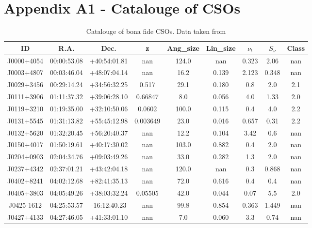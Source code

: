 
\section{Appendix A1 - Catalouge of CSOs}
\begin{table}[H]
    \centering
    \caption{Catalouge of bona fide CSOs. Data taken from \cite{kiehlmann2023compact}}
    \label{tab:CSO_sources}
    \begin{tabular}{@{}ccccccccc@{}}
        \toprule
        ID & R.A. & Dec. & z & Ang\_size & Lin\_size & $\nu_t$ & $S_\nu$ & Class \\ \midrule
        J0000+4054 & 00:00:53.08 & +40:54:01.81 & nan & 124.0 & nan & 0.323 & 2.06 & nan \\
        J0003+4807 & 00:03:46.04 & +48:07:04.14 & nan & 16.2 & 0.139 & 2.123 & 0.348 & nan \\
        J0029+3456 & 00:29:14.24 & +34:56:32.25 & 0.517 & 29.1 & 0.180 & 0.8 & 2.0 & 2.1 \\
        J0111+3906 & 01:11:37.32 & +39:06:28.10 & 0.66847 & 8.0 & 0.056 & 4.0 & 1.33 & 2.0 \\
        J0119+3210 & 01:19:35.00 & +32:10:50.06 & 0.0602 & 100.0 & 0.115 & 0.4 & 4.0 & 2.2 \\
        J0131+5545 & 01:31:13.82 & +55:45:12.98 & 0.003649 & 23.0 & 0.016 & 0.657 & 0.31 & 2.2 \\
        J0132+5620 & 01:32:20.45 & +56:20:40.37 & nan & 12.2 & 0.104 & 3.42 & 0.6 & nan \\
        J0150+4017 & 01:50:19.61 & +40:17:30.02 & nan & 103.0 & 0.882 & 0.4 & 2.0 & nan \\
        J0204+0903 & 02:04:34.76 & +09:03:49.26 & nan & 33.0 & 0.282 & 1.3 & 2.0 & nan \\
        J0237+4342 & 02:37:01.21 & +43:42:04.18 & nan & 120.0 & nan & 0.3 & 0.868 & nan \\
        J0402+8241 & 04:02:12.68 & +82:41:35.13 & nan & 72.0 & 0.616 & 0.4 & 0.4 & nan \\
        J0405+3803 & 04:05:49.26 & +38:03:32.24 & 0.05505 & 42.0 & 0.044 & 0.07 & 5.5 & 2.0 \\
        J0425-1612 & 04:25:53.57 & -16:12:40.23 & nan & 99.8 & 0.854 & 0.363 & 1.449 & nan \\
        J0427+4133 & 04:27:46.05 & +41:33:01.10 & nan & 7.0 & 0.060 & 3.3 & 0.74 & nan \\

\end{tabular}
\end{table}

